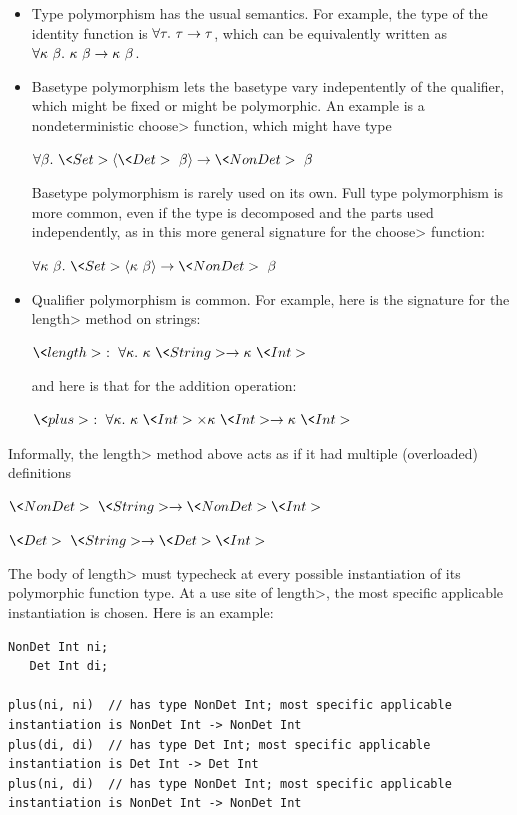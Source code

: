 \begin{itemize}
\item
Type polymorphism has the usual semantics.  For example, the type of the
identity function is $\forall \tau . \  \tau \rightarrow \tau$, which can be
equivalently written as
$\forall \kappa \ \beta . \  \kappa \ \beta \rightarrow \kappa \ \beta$.


\item
  Basetype polymorphism lets the basetype vary indepentently of the
  qualifier, which might be fixed or might be polymorphic.
  An example is a nondeterministic \<choose> function, which might have type

  $\forallt{\beta} \<Set>\angles{\<Det>\ \beta} \rightarrow \<NonDet>\ \beta$

  Basetype polymorphism is rarely used on its own.  Full type polymorphism is more
  common, even if the type is decomposed and the parts used independently,
  as in this more general signature for the \<choose> function:

  $\forallt{\kappa\ \beta} \<Set>\angles{\kappa\ \beta} \rightarrow \<NonDet>\ \beta$

\item
Qualifier polymorphism is common.  For example, here is the signature for
the \<length> method on strings:

$\<length>\ :\ \forallt{\kappa} \kappa\ \<String> \rightarrow \kappa\ \<Int>$

\noindent
and here is that for the addition operation:

$\<plus>\ :\ \forallt{\kappa} \kappa\ \<Int> \times \kappa\ \<Int> \rightarrow \kappa\ \<Int>$

\end{itemize}

Informally, the \<length> method above acts as if it had multiple
(overloaded) definitions

$\<NonDet>\ \<String> \rightarrow \<NonDet> \<Int>$

$\<Det>\ \<String> \rightarrow \<Det> \<Int>$

The body of \<length> must typecheck at every possible instantiation of its
polymorphic function type.  At a use site of \<length>,
the most specific applicable instantiation is chosen.
Here is an example:

\begin{Verbatim}
NonDet Int ni;
   Det Int di;

plus(ni, ni)  // has type NonDet Int; most specific applicable instantiation is NonDet Int -> NonDet Int
plus(di, di)  // has type Det Int; most specific applicable instantiation is Det Int -> Det Int
plus(ni, di)  // has type NonDet Int; most specific applicable instantiation is NonDet Int -> NonDet Int
\end{Verbatim}

